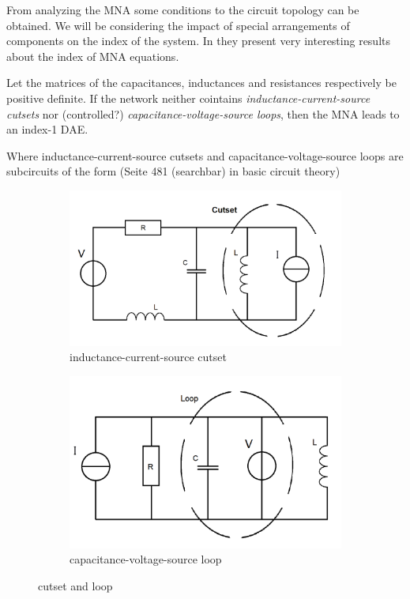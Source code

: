 From analyzing the MNA some conditions to the circuit topology can be obtained. We will be considering the impact of special arrangements of components on the index of the system. In \cite{Tischendorf2005Topological} they present very interesting results about the index of MNA equations.


\begin{theorem} \cite{Tischendorf2005Topological} \label{Index-1 condition}
	Let the matrices of the capacitances, inductances and resistances respectively be positive definite. If the network neither cointains \emph{inductance-current-source cutsets} nor (controlled?) \emph{capacitance-voltage-source loops}, then the MNA leads to an index-1 DAE.
\end{theorem}

Where inductance-current-source cutsets and capacitance-voltage-source loops are subcircuits of the form (Seite 481 (searchbar) in basic circuit theory)

\begin{figure}[H]
	\begin{subfigure}{0.5\textwidth}
		\centering
		\includegraphics[width=0.9\linewidth]{pictures/inductance-current-source_cutset.png}
		\caption{inductance-current-source cutset}
	\end{subfigure}
	\begin{subfigure}{0.5\textwidth}
		\centering
		\includegraphics[width=0.9\linewidth]{pictures/capacitance-voltage-source_loop.png}
		\caption{capacitance-voltage-source loop}
	\end{subfigure}
	\label{cutset and loop}
	\caption{cutset and loop}
\end{figure}

